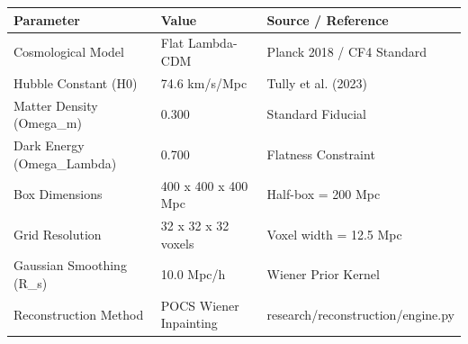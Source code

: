 \begin{tabular}{lll}
\hline
Parameter & Value & Source / Reference \\
\hline
Cosmological Model & Flat Lambda-CDM & Planck 2018 / CF4 Standard \\
Hubble Constant (H0) & 74.6 km/s/Mpc & Tully et al. (2023) \\
Matter Density (Omega\_m) & 0.300 & Standard Fiducial \\
Dark Energy (Omega\_Lambda) & 0.700 & Flatness Constraint \\
Box Dimensions & 400 x 400 x 400 Mpc & Half-box = 200 Mpc \\
Grid Resolution & 32 x 32 x 32 voxels & Voxel width = 12.5 Mpc \\
Gaussian Smoothing (R\_s) & 10.0 Mpc/h & Wiener Prior Kernel \\
Reconstruction Method & POCS Wiener Inpainting & research/reconstruction/engine.py \\
\hline
\end{tabular}
